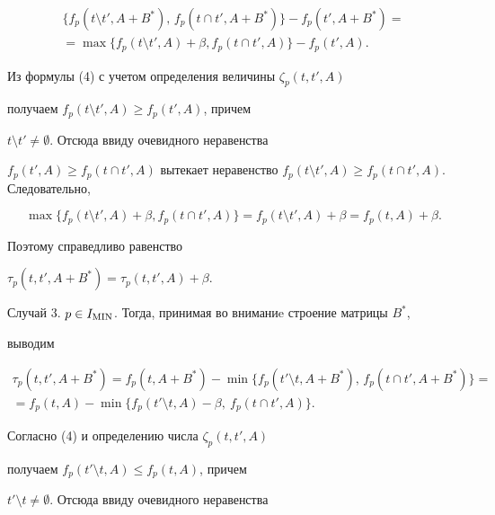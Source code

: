 \begin{pf}
\begin{multline*}
\{f_p(t\setminus t',A+B^*),\, f_p(t\cap t', A+B^*)\} -


f_p(t',A+B^*)= \\


=\max \{


f_p(t\setminus t', A)+\beta, f_p(t\cap t', A)\}-f_p(t',A).


\end{multline*}





Из формулы (4) с учетом определения величины $\zeta_p(t,t',A)$


получаем $f_p(t\setminus t', A)\ge f_p(t', A)$, причем


$t\setminus t'\ne \emptyset$. Отсюда ввиду очевидного неравенства


$f_p(t', A)\ge f_p(t\cap t', A)$ вытекает неравенство $f_p(t\setminus


t', A)\ge f_p(t\cap t', A)$. Следовательно,


$$


\max \{f_p(t\setminus t', A)+\beta, f_p(t\cap t', A)\}=


f_p(t\setminus t', A)+\beta=f_p(t, A)+\beta.


$$


Поэтому справедливо равенство


$\tau_p(t,t',A+B^*)=\tau_p(t,t',A)+\beta$.





Случай 3. $p\in I_{\operatorname{MIN}}$. Тогда, принимая во вниманиe строение матрицы $B^*$,


выводим


\begin{multline*}


\tau_p(t,t',A+B^*) =f_p(t,A+B^*)- \min


\{f_p(t'\setminus t,A+B^*),\, f_p(t\cap t', A+B^*)\}=\\


=f_p(t,A)- \min \{f_p(t'\setminus t,A)-\beta,\ f_p(t\cap t', A)\}.


\end{multline*}





Согласно (4) и определению числа $\zeta_p(t,t',A)$


получаем $f_p(t'\setminus t, A)\le f_p(t, A)$, причем


$t'\setminus t\ne \emptyset$. Отсюда ввиду очевидного неравенства



\end{pf}
